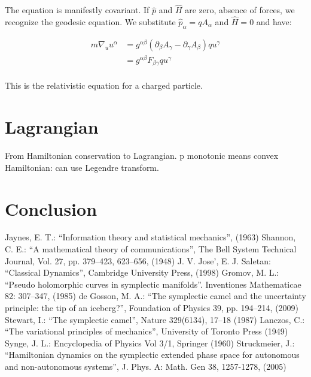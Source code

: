 \documentclass[aps,pra,10pt,twocolumn,floatfix,nofootinbib]{revtex4-1}
\theoremstyle{definition}
\begin{document}
The equation is manifestly covariant. If $\hat{p}$ and $\hat{H}$ are zero, absence of forces, we recognize the geodesic equation. We substitute $\hat{p}_\alpha = q A_\alpha$ and $\hat{H} = 0$ and have:

\begin{align*}
m \nabla_{u} u^\alpha &= g^{\alpha\beta} (\partial_\beta A_\gamma - \partial_\gamma A_\beta ) q u^\gamma \\
&= g^{\alpha\beta} F_{\beta \gamma} q u^\gamma\\
\end{align*}

This is the relativistic equation for a charged particle.

\section{Lagrangian}

From Hamiltonian conservation to Lagrangian. p monotonic means convex Hamiltonian: can use Legendre transform.

\section{Conclusion}

\begin{thebibliography}{0}

 Jaynes, E. T.: ``Information theory and statistical mechanics'', (1963)
 Shannon, C. E.: ``A mathematical theory of communications'', The Bell System Technical Journal, Vol. 27, pp. 379–423, 623–656, (1948)
 J. V. Jose', E. J. Saletan: ``Classical Dynamics'', Cambridge University Press, (1998)
 Gromov, M. L.: ``Pseudo holomorphic curves in symplectic manifolds''. Inventiones Mathematicae 82: 307–347, (1985)
 de Gosson, M. A.: ``The symplectic camel and the uncertainty principle: the tip of an iceberg?'', Foundation of Physics 39, pp. 194–214, (2009)
 Stewart, I.: ``The symplectic camel'', Nature 329(6134), 17–18 (1987)
 Lanczos, C.: ``The variational principles of mechanics'', University of Toronto Press (1949)
 Synge, J. L.: Encyclopedia of Physics Vol 3/1, Springer (1960)
 Struckmeier, J.: ``Hamiltonian dynamics on the symplectic extended phase space for autonomous and non-autonomous systems'', J. Phys. A: Math. Gen 38, 1257-1278, (2005)

\end{thebibliography}
\end{document}
